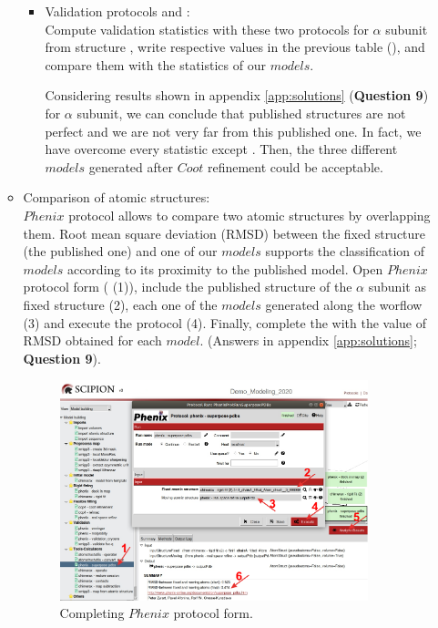 \begin{itemize}
\begin{itemize}
\begin{itemize}
    \item Validation protocols  and :\\
    Compute validation statistics with these two protocols for  $\alpha$ subunit from  structure , write respective values in the previous table (), and compare them with the statistics of our $models$.
    
    Considering results shown in appendix \ref{app:solutions} (\textbf{Question 9}) for  $\alpha$ subunit, we can conclude that published structures are not perfect and we are not very far from this published one. In fact, we have overcome every statistic except \ccmask. Then, the three different $models$ generated after $Coot$ refinement could be acceptable. \\

  \end{itemize}
 
  \item Comparison of atomic structures: \\
  
  $Phenix$ protocol  allows to compare two atomic structures by overlapping them. Root mean square deviation (RMSD) between the fixed structure (the published one) and one of our $models$ supports the classification of $models$ according to its proximity to the published model. Open $Phenix$  protocol form ( (1)), include the published structure of the  $\alpha$ subunit as fixed structure (2), each one of the $models$ generated along the worflow (3) and execute the protocol (4). Finally, complete the  with the value of RMSD obtained for each $model$. (Answers in appendix \ref{app:solutions}; \textbf{Question 9}).
  
  \begin{figure}[H]
    \centering 
    \captionsetup{width=.7\linewidth} 
    \includegraphics[width=0.90\textwidth]{Images/Fig37}
    \caption{Completing $Phenix$  protocol form.}
    \label{fig:superpose_pdbs_protocol}
    \end{figure}
    

\end{itemize}
\end{itemize}
